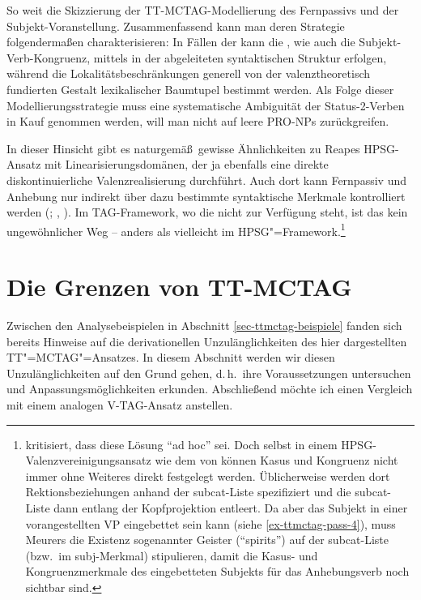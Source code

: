 So weit die Skizzierung der TT-MCTAG-Modellierung des Fernpassivs und der Subjekt-Voranstellung. Zusammenfassend kann man deren Strategie folgenderma\ss en charakterisieren: 
In Fällen der  kann die , wie auch die Subjekt-Verb-Kongruenz, mittels  in der abgeleiteten syntaktischen Struktur erfolgen, während die Lokalitätsbeschränkungen generell von der valenztheoretisch fundierten Gestalt lexikalischer Baumtupel bestimmt werden. Als Folge dieser Modellierungsstrategie muss eine systematische Ambiguität der Status-2-Verben in Kauf genommen werden, will man nicht auf leere PRO-NPs zurückgreifen. 

In dieser Hinsicht gibt es naturgemä\ss\ gewisse Ähnlichkeiten zu Reapes HPSG-Ansatz mit Linearisierungsdomänen, der ja ebenfalls eine direkte diskontinuierliche Valenzrealisierung durchführt. Auch dort kann Fernpassiv und Anhebung nur indirekt über dazu bestimmte syntaktische Merkmale kontrolliert werden (\citealt[Abschnitt~5.1]{Kathol:98}; \citealt[Abschnitt~21.1]{Mueller:99}, \citealt[Abschnitt~8.6]{Kathol:00}). Im TAG-Framework, wo die  nicht zur Verfügung steht, ist das kein ungewöhnlicher Weg -- anders als vielleicht im HPSG"=Framework.\footnote{\citet[279]{Mueller:07} kritisiert, dass diese Lösung "`ad hoc"' sei. Doch selbst in einem HPSG-Valenz\-vereinigungs\-ansatz wie dem von \cite{Meurers:99} können Kasus und Kongruenz nicht immer ohne Weiteres direkt festgelegt werden. Üblicherweise werden dort Rektionsbeziehungen anhand der {\sc subcat}-Liste spezifiziert und die {\sc subcat}-Liste dann entlang der Kopfprojektion entleert. Da aber das Subjekt in einer vorangestellten VP eingebettet sein kann (siehe \ref{ex-ttmctag-pass-4}), muss Meurers die Existenz sogenannter Geister ("`spirits"') auf der {\sc subcat}-Liste (bzw.\ im {\sc subj}-Merkmal) stipulieren, damit die Kasus- und Kongruenzmerkmale des eingebetteten Subjekts für das Anhebungsverb noch sichtbar sind.}   



\section{Die Grenzen von TT-MCTAG} \label{sec-ttmctag-grenzen}

Zwischen den Analysebeispielen in Abschnitt \ref{sec-ttmctag-beispiele} fanden sich bereits Hinweise auf die derivationellen Unzulänglichkeiten des hier dargestellten TT"=MCTAG"=Ansatzes. In diesem Abschnitt werden wir diesen Unzulänglichkeiten auf den Grund gehen, d.\,h.\ ihre Voraussetzungen untersuchen und Anpassungsmöglichkeiten erkunden. Abschlie\ss end möchte ich einen Vergleich mit einem analogen V-TAG-Ansatz anstellen.  


